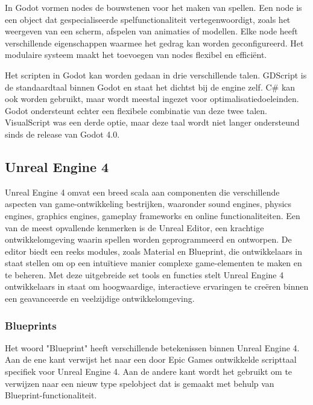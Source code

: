 In Godot vormen nodes de bouwstenen voor het maken van spellen. Een node is een object dat gespecialiseerde spelfunctionaliteit vertegenwoordigt, zoals het weergeven van een scherm, afspelen van animaties of modellen. Elke node heeft verschillende eigenschappen waarmee het gedrag kan worden geconfigureerd. Het modulaire systeem maakt het toevoegen van nodes flexibel en efficiënt. \autocite{Bradfield2018}

Het scripten in Godot kan worden gedaan in drie verschillende talen. GDScript is de standaardtaal binnen Godot en staat het dichtst bij de engine zelf. C# kan ook worden gebruikt, maar wordt meestal ingezet voor optimalisatiedoeleinden. Godot ondersteunt echter een flexibele combinatie van deze twee talen.\autocite{Bradfield2018} VisualScript was een derde optie, maar deze taal wordt niet langer ondersteund sinds de release van Godot 4.0.

\subsection{Unreal Engine 4}
Unreal Engine 4 omvat een breed scala aan componenten die verschillende aspecten van game-ontwikkeling bestrijken, waaronder sound engines, physics engines, graphics engines, gameplay frameworks en online functionaliteiten. Een van de meest opvallende kenmerken is de Unreal Editor, een krachtige ontwikkelomgeving waarin spellen worden geprogrammeerd en ontworpen. De editor biedt een reeks modules, zoals Material en Blueprint, die ontwikkelaars in staat stellen om op een intuïtieve manier complexe game-elementen te maken en te beheren. Met deze uitgebreide set tools en functies stelt Unreal Engine 4 ontwikkelaars in staat om hoogwaardige, interactieve ervaringen te creëren binnen een geavanceerde en veelzijdige ontwikkelomgeving. \autocite{lee2016learning}

\subsubsection{Blueprints}
Het woord "Blueprint" heeft verschillende betekenissen binnen Unreal Engine 4. Aan de ene kant verwijst het naar een door Epic Games ontwikkelde scripttaal specifiek voor Unreal Engine 4. Aan de andere kant wordt het gebruikt om te verwijzen naar een nieuw type spelobject dat is gemaakt met behulp van Blueprint-functionaliteit.
\autocite{romero2019blueprints}

